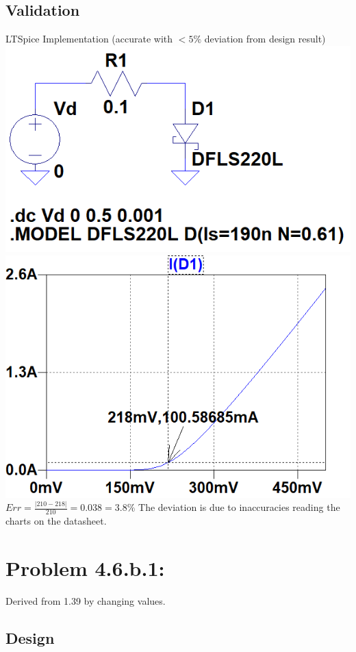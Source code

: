 \documentclass[12pt,letterpaper,titlepage]{article}
\begin{document}
\begin{raggedright}
\subsection{Validation}

\begin{center}
LTSpice Implementation (accurate with $< 5\%$ deviation from design result)
\includegraphics[width=.49\textwidth, height=\textheight, keepaspectratio=true]{ds1b}
\includegraphics[width=.49\textwidth, height=\textheight, keepaspectratio=true]{ds1c}
$Err = \frac{|210-218|}{210} = 0.038 = 3.8\%$ The deviation is due to inaccuracies reading the charts on the datasheet.
\end{center}

\clearpage
\section{Problem 4.6.b.1: } Derived from 1.39 by changing values.
\subsection{Design}


\end{raggedright}
\end{document}
